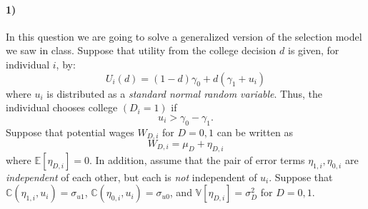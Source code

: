 \documentclass[12pt]{article}
\newcommand\BB{\mathbb}
\newcommand\EE{\mathbb{E}}
\numberwithin{equation}{section}
\numberwithin{figure}{section}
\numberwithin{table}{section}
\begin{document}
\paragraph{1)} In this question we are going to solve a generalized version of the selection model we saw in class. Suppose that utility from the college decision $d$ is given, for individual $i$, by:
\[U_i(d) = (1-d)\gamma_0 + d(\gamma_1 + u_i)\]
where $u_i$ is distributed as a \emph{standard normal random variable}. Thus, the individual chooses college $(D_i=1)$ if
\[u_i > \gamma_0-\gamma_1.\]
Suppose that potential wages $W_{D,i}$ for $D=0,1$ can be written as
\[ W_{D,i} = \mu_D + \eta_{D,i} \]
where $\EE[\eta_{D,i}]=0$. In addition, assume that the pair of error terms $\eta_{1,i},\eta_{0,i}$ are \emph{independent} of each other, but each is \emph{not} independent of $u_i$. Suppose that $\BB{C}(\eta_{1,i},u_i)=\sigma_{u1}$, $\BB{C}(\eta_{0,i},u_i)=\sigma_{u0}$, and $\BB{V}[\eta_{D,i}]=\sigma^2_D$ for $D=0,1$.
\end{document}
